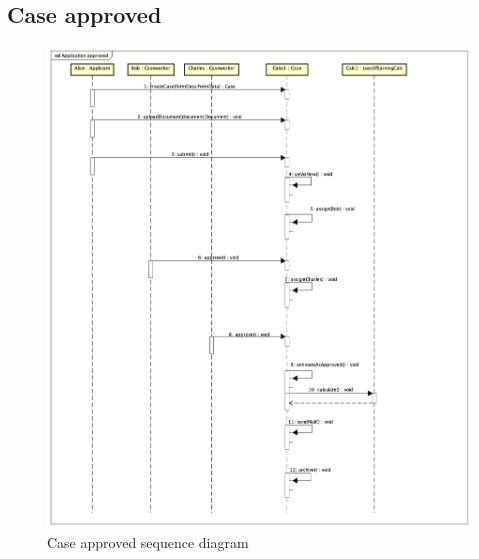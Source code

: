 \subsection{Case approved}
\begin{figure}[htb!]
    \centering
    \includegraphics[width=\textwidth]{img/sd-application-approved.png}
    \caption{Case approved sequence diagram}
    \label{fig:my_label}
\end{figure}

\newpage
